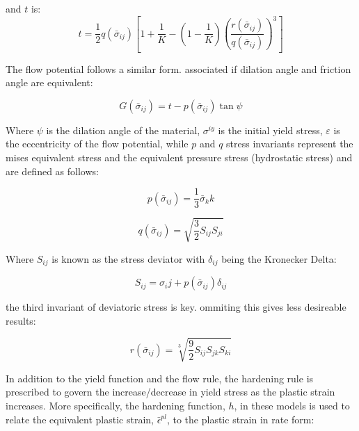 and $t$ is:
\begin{equation}
t=\frac{1}{2}q\left(\bar{\sigma}_{ij}\right)\left [ 1+\frac{1}{K}-\left ( 1-\frac{1}{K} \right )\left ( \frac{r\left(\bar{\sigma}_{ij}\right)}{q\left(\bar{\sigma}_{ij}\right)} \right )^3 \right ]
\label{eqn:const10}
\end{equation}

The flow potential follows a similar form. associated if dilation angle and friction angle are equivalent:

\begin{equation}
G\left(\bar{\sigma}_{ij}\right)=t-p\left(\bar{\sigma}_{ij}\right)\tan\psi\label{eqn:const11}
\end{equation}

Where $\psi$ is the dilation angle of the material, $\sigma^{iy}$ is the initial yield stress, $\varepsilon$ is the eccentricity of the flow potential, while $p$ and $q$ stress invariants represent the mises equivalent stress and the equivalent pressure stress (hydrostatic stress) and are defined as follows:

\begin{equation}
p\left(\bar{\sigma}_{ij}\right)=\frac{1}{3}\bar{\sigma}_kk
\label{eqn:druc3}
\end{equation}

\begin{equation}
q\left(\bar{\sigma}_{ij}\right)=\sqrt{\frac{3}{2}S_{ij}S_{ji}}\label{eqn:druc4}
\end{equation}

Where $S_{ij}$ is known as the stress deviator with $\delta_{ij}$ being the Kronecker Delta:

\begin{equation}
S_{ij} = \sigma_ij + p\left(\bar{\sigma}_{ij}\right)\delta_{ij}
\label{eqn:druc4-1}
\end{equation}

the third invariant of deviatoric stress is key. ommiting this gives less desireable results:

\begin{equation}
r\left(\bar{\sigma}_{ij}\right)= \sqrt[3]{\frac{9}{2}S_{ij} S_{jk} S_{ki}}
\label{eqn:druc4-2}
\end{equation}

In addition to the yield function and the flow rule, the hardening rule is prescribed to govern the increase/decrease in yield stress as the plastic strain increases. More specifically, the hardening function, $h$, in these models is used to relate the equivalent plastic strain, $\bar{\epsilon}^{pl}$,  to the plastic strain in rate form: 

